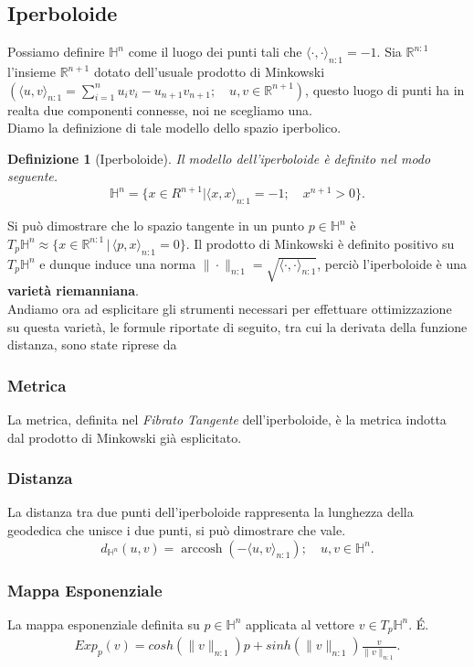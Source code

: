 \documentclass[a4paper, 12pt]{article}
\newtheorem{definition}{Definizione}
\DeclareMathOperator\arccosh{arccosh}
\begin{document}
\subsection{Iperboloide}
Possiamo definire $\mathbb{H}^n$ come il luogo dei punti tali che $\langle \cdot, \cdot \rangle_{n:1} = -1$. Sia $\mathbb{R}^{n:1}$ l'insieme $\mathbb{R}^{n+1}$ dotato dell'usuale prodotto di Minkowski $(\langle u, v \rangle_{n:1} = \sum_{i=1}^{n} u_iv_i - u_{n+1}v_{n+1}; \quad u,v \in \mathbb{R}^{n+1})$, questo luogo di punti ha in realta due componenti connesse, noi ne scegliamo una.\\
Diamo la definizione di tale modello dello spazio iperbolico.
\begin{definition}[Iperboloide]
Il modello dell'iperboloide è definito nel modo seguente.\\
\[\mathbb{H}^n = \{x \in R^{n+1} | \langle x, x \rangle_{n:1} = -1; \quad x^{n+1} > 0 \}.\]
\end{definition}
Si può dimostrare che lo spazio tangente in un punto $p \in \mathbb{H}^n$ è $T_p\mathbb{H}^n \approx \{x \in \mathbb{R}^{n:1} \, | \, \langle p,x \rangle_{n:1} = 0\}$. Il prodotto di Minkowski è definito positivo su $T_p\mathbb{H}^n$ e dunque induce una norma $\| \cdot \|_{n:1} = \sqrt{\langle \cdot, \cdot \rangle_{n:1}}$, perciò l'iperboloide è una \textbf{varietà riemanniana}.\\
Andiamo ora ad esplicitare gli strumenti necessari per effettuare ottimizzazione su questa varietà, le formule riportate di seguito, tra cui la derivata della funzione distanza, sono state riprese da \cite{Wilson}
\subsubsection{Metrica}
La metrica, definita nel \textit{Fibrato Tangente} dell'iperboloide, è la metrica indotta dal prodotto di Minkowski già esplicitato.
\subsubsection{Distanza}
La distanza tra due punti dell'iperboloide rappresenta la lunghezza della geodedica che unisce i due punti, si può dimostrare che vale.\\
\[d_{\mathbb{H}^n} (u,v) = \arccosh (-\langle u, v \rangle_{n:1}); \quad u,v \in \mathbb{H}^n.\]
\subsubsection{Mappa Esponenziale}
La mappa esponenziale definita su $p \in \mathbb{H}^n$ applicata al vettore $v \in T_p\mathbb{H}^n$. \'E.\\
\begin{equation*}\begin{gathered}
Exp_p(v) = cosh(\| v \|_{n:1})p + sinh(\| v \|_{n:1}) \frac{v}{\| v \|_{n:1}}.
\end{gathered}\end{equation*}
\end{document}
